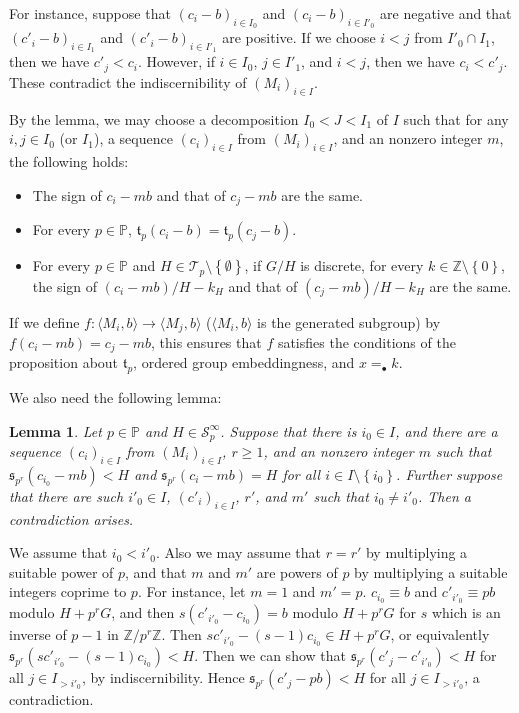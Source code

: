 \documentclass{article}
\theoremstyle{definition}
\theoremstyle{remark}
\theoremstyle{plain}
\newtheorem*{lem*}{Lemma}
\begin{document}
For instance, suppose that $(c_i - b)_{i \in I_0}$ and $(c_i - b)_{i \in I'_0}$ are negative and that $(c'_i - b)_{i \in I_1}$ and $(c'_i - b)_{i \in I'_1}$ are positive.
If we choose $i < j$ from $I'_0 \cap I_1$, then we have $c'_j < c_i$.
However, if $i \in I_0$, $j \in I'_1$, and $i < j$, then we have $c_i < c'_j$.
These contradict the indiscernibility of $(M_i)_{i \in I}$.

By the lemma, we may choose a decomposition $I_0 < J < I_1$ of $I$ such that for any $i, j \in I_0$ (or $I_1$), a sequence $(c_i)_{i \in I}$ from $(M_i)_{i \in I}$, and an nonzero integer $m$, the following holds:
\begin{itemize}
	\item The sign of $c_i - mb$ and that of $c_j - mb$ are the same.
	\item For every $p \in \mathbb{P}$, $\mathfrak{t}_p(c_i - b) = \mathfrak{t}_p(c_j - b)$.
	\item For every $p \in \mathbb{P}$ and $H \in \mathcal{T}_p \setminus \left\{ \emptyset \right\}$, if $G / H$ is discrete, for every $k \in \mathbb{Z} \setminus \left\{ 0 \right\}$, the sign of $(c_i - mb) / H - k_H$ and that of $(c_j - mb) / H - k_H$ are the same.
\end{itemize}
If we define $f: \langle M_i, b \rangle \to \langle M_j, b \rangle$ ($\langle M_i, b \rangle$ is the generated subgroup) by $f(c_i - mb) = c_j - mb$, this ensures that $f$ satisfies the conditions of the proposition about $\mathfrak{t}_p$, ordered group embeddingness, and $x =_{\bullet} k$.

We also need the following lemma:

\begin{lem*}
	Let $p \in \mathbb{P}$ and $H \in \mathcal{S}_p^{\infty}$.
	Suppose that there is $i_0 \in I$, and there are a sequence $(c_i)_{i \in I}$ from $(M_i)_{i \in I}$, $r \geq 1$, and an nonzero integer $m$ such that $\mathfrak{s}_{p^r}(c_{i_0} - mb) < H$ and $\mathfrak{s}_{p^r}(c_i - mb) = H$ for all $i \in I \setminus \left\{ i_0 \right\}$.
	Further suppose that there are such $i'_0 \in I$, $(c'_i)_{i \in I}$, $r'$, and $m'$ such that $i_0 \neq i'_0$.
	Then a contradiction arises.
\end{lem*}

We assume that $i_0 < i'_0$.
Also we may assume that $r = r'$ by multiplying a suitable power of $p$, and that $m$ and $m'$ are powers of $p$ by multiplying a suitable integers coprime to $p$.
For instance, let $m = 1$ and $m' = p$.
$c_{i_0} \equiv b$ and $c'_{i'_0} \equiv pb$ modulo $H + p^r G$, and then $s(c'_{i'_0} - c_{i_0}) = b$ modulo $H + p^r G$ for $s$ which is an inverse of $p - 1$ in $\mathbb{Z} / p^r \mathbb{Z}$.
Then $s c'_{i'_0} - (s-1) c_{i_0} \in H + p^r G$, or equivalently $\mathfrak{s}_{p^r}(s c'_{i'_0} - (s-1) c_{i_0}) < H$.
Then we can show that $\mathfrak{s}_{p^r}(c'_j - c'_{i'_0}) < H$ for all $j \in I_{>i'_0}$, by indiscernibility.
Hence $\mathfrak{s}_{p^r}(c'_j - pb) < H$ for all $j \in I_{>i'_0}$, a contradiction.
\end{document}

